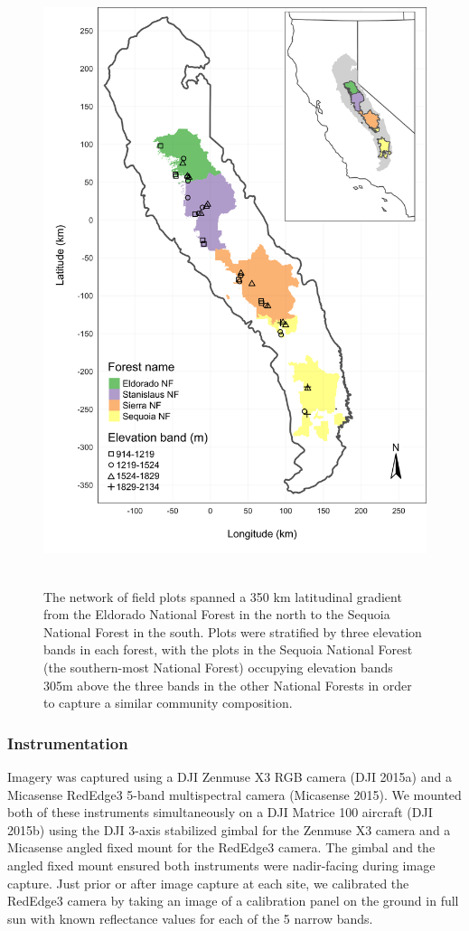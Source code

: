 \documentclass[]{article}
\begin{document}
\begin{figure}
\centering
\includegraphics[height=7.00000in]{../../figures/study-geographic-extent-inset.png}
\caption{The network of field plots spanned a 350 km latitudinal
gradient from the Eldorado National Forest in the north to the Sequoia
National Forest in the south. Plots were stratified by three elevation
bands in each forest, with the plots in the Sequoia National Forest (the
southern-most National Forest) occupying elevation bands 305m above the
three bands in the other National Forests in order to capture a similar
community composition.}
\end{figure}

\subsubsection{Instrumentation}\label{instrumentation}

Imagery was captured using a DJI Zenmuse X3 RGB camera (DJI 2015a) and a
Micasense RedEdge3 5-band multispectral camera (Micasense 2015). We
mounted both of these instruments simultaneously on a DJI Matrice 100
aircraft (DJI 2015b) using the DJI 3-axis stabilized gimbal for the
Zenmuse X3 camera and a Micasense angled fixed mount for the RedEdge3
camera. The gimbal and the angled fixed mount ensured both instruments
were nadir-facing during image capture. Just prior or after image
capture at each site, we calibrated the RedEdge3 camera by taking an
image of a calibration panel on the ground in full sun with known
reflectance values for each of the 5 narrow bands.
\end{document}
